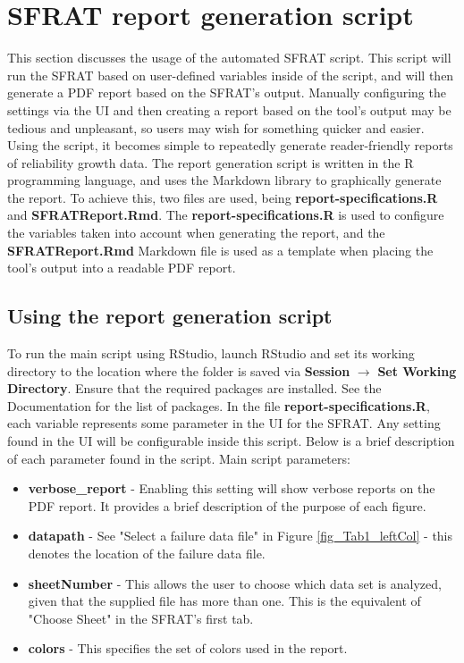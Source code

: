 \documentclass[conference]{IEEEtran}
\begin{document}
\section{SFRAT report generation script}\label{sec:Script}
This section discusses the usage of the automated SFRAT script. This script will run the SFRAT based on user-defined variables inside of the script, and will then generate a PDF report based on the SFRAT's output. Manually configuring the settings via the UI and then creating a report based on the tool's output may be tedious and unpleasant, so users may wish for something quicker and easier. Using the script, it becomes simple to repeatedly generate reader-friendly reports of reliability growth data. The report generation script is written in the R programming language, and uses the Markdown library to graphically generate the report. To achieve this, two files are used, being \textbf{report-specifications.R} and
\textbf{SFRATReport.Rmd}. The \textbf{report-specifications.R} is used to configure the variables taken into account when generating the report, and the \textbf{SFRATReport.Rmd} Markdown file is used as a template when placing the tool's output into a readable PDF report.

\subsection{Using the report generation script}\label{sec:ScriptRun}
To run the main script using RStudio, launch RStudio and set its working directory to the location where the folder is saved via \textbf{Session} $\to$ \textbf{Set Working Directory}. Ensure that the required packages are installed. See the Documentation for the list of packages. In the file \textbf{report-specifications.R}, each variable represents some parameter in the UI for the SFRAT. Any setting found in the UI will be configurable inside this script. Below is a brief description of each parameter found in the script.
\noindent Main script parameters:
    \begin{itemize}
    \item {\textbf{verbose\_report} - Enabling this setting will show verbose reports on the PDF report. It provides a brief description of the purpose of each figure.}
      \item {\textbf{datapath} - See "Select a failure data file" in Figure \ref{fig_Tab1_leftCol} - this denotes the location of the failure data file.}
      \item {\textbf{sheetNumber} - This allows the user to choose which data set is analyzed, given that the supplied file has more than one. This is the equivalent of "Choose Sheet" in the SFRAT's first tab.}
      \item {\textbf{colors} - This specifies the set of colors used in the report.}
    \end{itemize}
\end{document}
